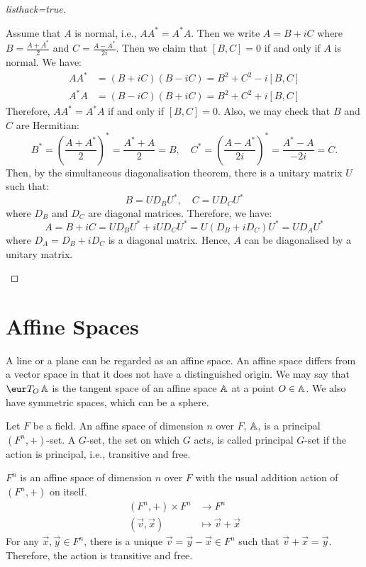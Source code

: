 \begin{proof}[listhack=true]
\begin{description}[labelwidth=\widthof{\bfseries $(\Rightarrow)$}]
		\item[$(\Leftarrow)$] Assume that $A$ is normal, i.e., $A A^* = A^* A$. Then we write $A = B + iC$ where $B = \frac{A + A^*}{2}$ and $C = \frac{A - A^*}{2i}$. Then we claim that $[B, C] = 0$ if and only if $A$ is normal. We have:
		      \begin{align*}
			      A A^* & = (B + iC)(B - iC) = B^2 + C^2 - i [B, C] \\
			      A^* A & = (B - iC)(B + iC) = B^2 + C^2 + i [B, C]
		      \end{align*}
		      Therefore, $A A^* = A^* A$ if and only if $[B, C] = 0$. Also, we may check that $B$ and $C$ are Hermitian:
		      \[
			      B^* = {\left(\frac{A + A^*}{2}\right)}^* = \frac{A^* + A}{2} = B, \quad C^* = {\left(\frac{A - A^*}{2i}\right)}^* = \frac{A^* - A}{-2i} = C.
		      \]
		      Then, by the simultaneous diagonalisation theorem, there is a unitary matrix $U$ such that:
		      \[
			      B = U D_B U^*, \quad C = U D_C U^*
		      \]
		      where $D_B$ and $D_C$ are diagonal matrices. Therefore, we have:
		      \[
			      A = B + iC = U D_B U^* + i U D_C U^* = U (D_B + i D_C) U^* = U D_A U^*
		      \]
		      where $D_A = D_B + i D_C$ is a diagonal matrix. Hence, $A$ can be diagonalised by a unitary matrix. \qedhere
	\end{description}
\end{proof}

\section{Affine Spaces}

A line or a plane can be regarded as an affine space. An affine space differs from a vector space in that it does not have a distinguished origin. We may say that $\mathcal{T}_O \A$ is the tangent space of an affine space $\operatorname{\mathbb{A}}$ at a point $O \in \operatorname{\mathbb{A}}$. We also have symmetric spaces, which can be a sphere.

Let $F$ be a field. An affine space of dimension $n$ over $F$, $\operatorname{\mathbb{A}}$, is a principal $(F^n, +)$-set.  A $G$-set, the set on which $G$ acts, is called principal $G$-set if the action is principal, i.e., transitive and free.

\begin{example}
	$F^n$ is an affine space of dimension $n$ over $F$ with the usual addition action of $(F^n, +)$ on itself.
	\begin{align*}
		(F^n, +) \times F^n & \to F^n                   \\
		(\vec{v}, \vec{x})  & \mapsto \vec{v} + \vec{x}
	\end{align*}
	For any $\vec{x}, \vec{y} \in F^n$, there is a unique $\vec{v} = \vec{y} - \vec{x} \in F^n$ such that $\vec{v} + \vec{x} = \vec{y}$. Therefore, the action is transitive and free.
\end{example}

